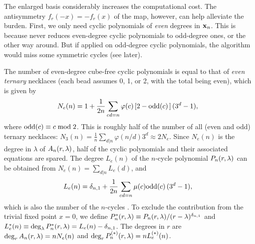 \documentclass{ws-ijbc}
\begin{document}
%
The enlarged basis considerably increases the computational cost.
%
The antisymmetry
  $f_r(-x) = -f_r(x)$
of the map, however, can help alleviate the burden.
%
First, we only need cyclic polynomials
  of \emph{even} %
  degrees in $\mathbf{x}_{n}$.
%
This is because  %
never reduces even-degree cyclic polynomials
to odd-degree ones,
or the other way around.
%
But if applied on odd-degree cyclic polynomials,
  the algorithm would miss some symmetric cycles (see later).
%







The number of even-degree cube-free cyclic polynomials
is equal to that of \emph{even ternary} necklaces
(each bead assumes 0, 1, or 2, with the total being even),
which is given by
%
\begin{equation}
  N_e(n) = 1 +
    \frac{1}{2n} \sum_{c d = n} \varphi(c)
    \left[ 2 - \mathrm{odd}(c) \, \right]
    (3^d-1),
\notag
\end{equation}
where
$\mathrm{odd}(c) \equiv c \bmod 2$.
%
This is roughly half of the number of all (even and odd) ternary necklaces:
$N_3(n) = \frac{1}{n} \sum_{d|n} \varphi(n/d) 3^d \approx 2 N_e$.
%
%
Since $N_e(n)$ is the degree in $\lambda$ of $A_n(r, \lambda)$,
  half of the cyclic polynomials and their associated equations are spared.
%
The degree $L_e(n)$ of the $n$-cycle polynomial $P_n(r, \lambda)$
  can be obtained from
  $N_e(n) = \sum_{d|n} L_e(d)$,
and
%
%
\begin{equation}
  L_e(n) = \delta_{n, 1} +
    \frac{1}{2n} \sum_{cd = n} \mu(c) \mathrm{odd}(c) \, (3^d-1),
\notag
\end{equation}
%
%
%
which is also the number of the $n$-cycles \cite{zeng}.
%
To exclude the contribution from the trivial fixed point $x = 0$,
we define
  $P^*_n(r, \lambda) \equiv P_n(r, \lambda)/(r-\lambda)^{\delta_{n,1}}$
and
  $L^*_e(n) \equiv \deg_\lambda P^*_n(r, \lambda) = L_e(n) - \delta_{n,1}$.
%
%
%
The degrees in $r$ are
  $\deg_r A_n(r, \lambda) = n N_e(n)$
  and
  $\deg_r P^{(*)}_n(r, \lambda) = n L^{(*)}_e(n)$.
\end{document}
